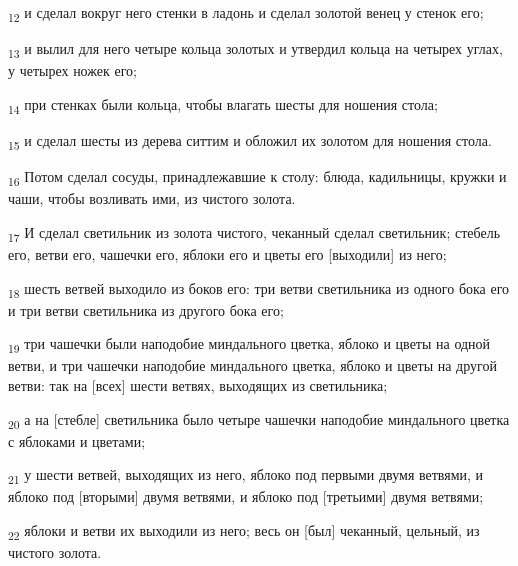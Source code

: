 \begin{tcolorbox}
\textsubscript{12} и сделал вокруг него стенки в ладонь и сделал золотой венец у стенок его;
\end{tcolorbox}
\begin{tcolorbox}
\textsubscript{13} и вылил для него четыре кольца золотых и утвердил кольца на четырех углах, у четырех ножек его;
\end{tcolorbox}
\begin{tcolorbox}
\textsubscript{14} при стенках были кольца, чтобы влагать шесты для ношения стола;
\end{tcolorbox}
\begin{tcolorbox}
\textsubscript{15} и сделал шесты из дерева ситтим и обложил их золотом для ношения стола.
\end{tcolorbox}
\begin{tcolorbox}
\textsubscript{16} Потом сделал сосуды, принадлежавшие к столу: блюда, кадильницы, кружки и чаши, чтобы возливать ими, из чистого золота.
\end{tcolorbox}
\begin{tcolorbox}
\textsubscript{17} И сделал светильник из золота чистого, чеканный сделал светильник; стебель его, ветви его, чашечки его, яблоки его и цветы его [выходили] из него;
\end{tcolorbox}
\begin{tcolorbox}
\textsubscript{18} шесть ветвей выходило из боков его: три ветви светильника из одного бока его и три ветви светильника из другого бока его;
\end{tcolorbox}
\begin{tcolorbox}
\textsubscript{19} три чашечки были наподобие миндального цветка, яблоко и цветы на одной ветви, и три чашечки наподобие миндального цветка, яблоко и цветы на другой ветви: так на [всех] шести ветвях, выходящих из светильника;
\end{tcolorbox}
\begin{tcolorbox}
\textsubscript{20} а на [стебле] светильника было четыре чашечки наподобие миндального цветка с яблоками и цветами;
\end{tcolorbox}
\begin{tcolorbox}
\textsubscript{21} у шести ветвей, выходящих из него, яблоко под первыми двумя ветвями, и яблоко под [вторыми] двумя ветвями, и яблоко под [третьими] двумя ветвями;
\end{tcolorbox}
\begin{tcolorbox}
\textsubscript{22} яблоки и ветви их выходили из него; весь он [был] чеканный, цельный, из чистого золота.
\end{tcolorbox}

